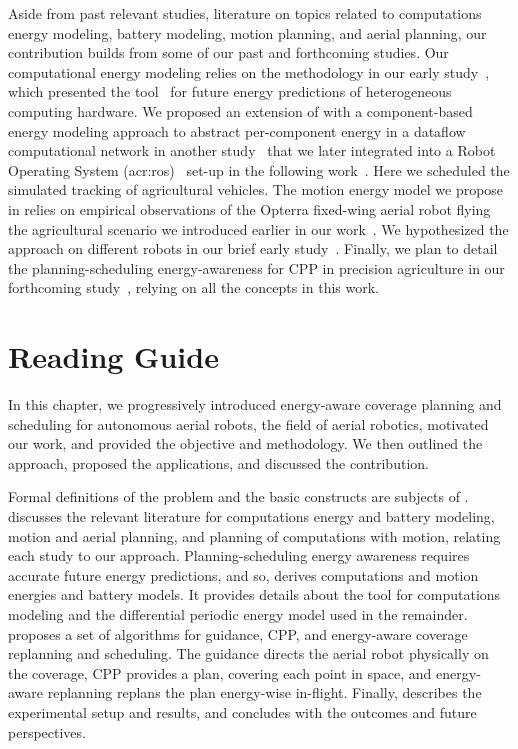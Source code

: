 Aside from past relevant studies, literature on topics related to computations energy modeling, battery modeling, motion planning, and aerial planning, our contribution builds from some of our past and forthcoming studies. Our computational energy modeling relies on the methodology in our early study~\citep{seewald2019coarse}, which presented the \powprof{} tool~\citep{powprofiler} for future energy predictions of heterogeneous computing hardware. We proposed an extension of \powprof{} with a component-based energy modeling approach to abstract per-component energy in a dataflow computational network in another study~\citep{seewald2019component} that we later integrated into a Robot Operating System (\Gls{acr:ros})~\citep{quigley2009ros} set-up in the following work~\citep{zamanakos2020energy}. Here we scheduled the simulated tracking of agricultural vehicles. The motion energy model we propose in  relies on empirical observations of the Opterra fixed-wing aerial robot flying the agricultural scenario we introduced earlier in our work~\citep{seewald2020mechanical}. We hypothesized the approach on different robots in our brief early study~\citep{seewald2020beyond}. Finally, we plan to detail the planning-scheduling energy-awareness for CPP in precision agriculture in our forthcoming study~\citep{seewald202Xenergy}, relying on all the concepts in this work. 


\section{Reading Guide}
\label{sec:structure}

In this chapter, we progressively introduced energy-aware coverage planning and scheduling for autonomous aerial robots, the field of aerial robotics, motivated our work, and provided the objective and methodology. We then outlined the approach, proposed the applications, and discussed the contribution.

Formal definitions of the problem and the basic constructs are subjects of .  discusses the relevant literature for computations energy and battery modeling, motion and aerial planning, and planning of computations with motion, relating each study to our approach. Planning-scheduling energy awareness requires accurate future energy predictions, and so,  derives computations and motion energies and battery models. It provides details about the \powprof{} tool for computations modeling and the differential periodic energy model used in the remainder.  proposes a set of algorithms for guidance, CPP, and energy-aware coverage replanning and scheduling. The guidance directs the aerial robot physically on the coverage, CPP provides a plan, covering each point in space, and energy-aware replanning replans the plan energy-wise in-flight. Finally,  describes the experimental setup and results, and  concludes with the outcomes and future perspectives.


